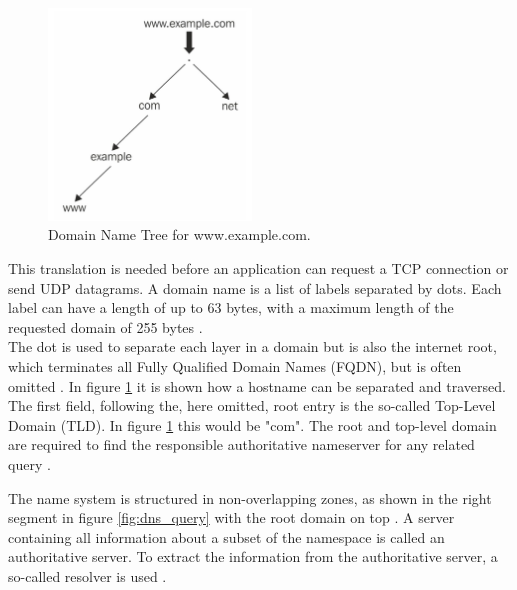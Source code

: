         \begin{figure}
    	    \includegraphics[width=0.48\textwidth]{latex/figures/domain_name_tree.jpg}
    	    \caption[Domain Name Tree for www.example.com.]{Domain Name Tree for www.example.com. \cite{jeftovic_managing_2018}}
    	    \label{fig:dns_tree}
        \end{figure}
        This translation is needed before an application can request a TCP connection or send UDP datagrams. A domain name is a list of labels separated by dots. 
        Each label can have a length of up to 63 bytes, with a maximum length of the requested domain of 255 bytes \cite{stevens_tcpip_1993}.\\
        The dot is used to separate each layer in a domain but is also the internet root, which terminates all Fully Qualified Domain Names (FQDN), but is often omitted \cite{jeftovic_managing_2018}.
        In figure \ref{fig:dns_tree} it is shown how a hostname can be separated and traversed.
        The first field, following the, here omitted, root entry is the so-called Top-Level Domain (TLD). In figure \ref{fig:dns_tree} this would be "com". The root and top-level domain are required to find the responsible authoritative nameserver for any related query \cite{jeftovic_managing_2018}.
 
        The name system is structured in non-overlapping zones, as shown in the right segment in figure \ref{fig:dns_query} with the root domain on top \cite{herrmann_beobachtungsmoglichkeiten_2016}.
        A server containing all information about a subset of the namespace is called an authoritative server. To extract the information from the authoritative server, a so-called resolver is used \cite{friedewald_privacy_2018}.
        

